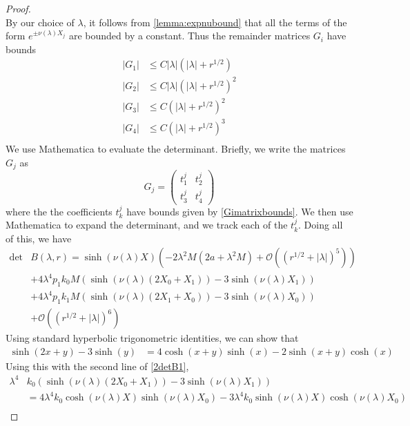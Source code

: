 \documentclass[thesis.tex]{subfiles}
\begin{document}
\begin{lemma}
\begin{proof}
\[\]
By our choice of $\lambda$, it follows from \cref{lemma:expnubound} that all the terms of the form $e^{\pm \nu(\lambda)X_j}$ are bounded by a constant. Thus the remainder matrices $G_i$ have bounds
\begin{equation}\label{Gimatrixbounds}
\begin{aligned}
|G_1| &\leq C |\lambda| (|\lambda| + r^{1/2} )\\
|G_2| &\leq C |\lambda| (|\lambda| + r^{1/2} )^2 \\
|G_3| &\leq C (|\lambda| + r^{1/2} )^2 \\
|G_4| &\leq C (|\lambda| + r^{1/2} )^3 \\
\end{aligned}
\end{equation}
We use Mathematica to evaluate the determinant. Briefly, we write the matrices $G_j$ as
\[
G_j = \begin{pmatrix}t^j_1 & t^j_2 \\ t^j_3 & t^j_4 \end{pmatrix}
\]
where the the coefficients $t^j_k$ have bounds given by \cref{Gimatrixbounds}. We then use Mathematica to expand the determinant, and we track each of the $t^j_k$. Doing all of this, we have
\begin{equation}\label{2detB1}
\begin{aligned}
\det &B(\lambda, r) = \sinh(\nu(\lambda)X)\left(-2 \lambda^2 M (2a + \lambda^2 M) +  \mathcal{O}( (r^{1/2} + |\lambda|)^5 )\right) \\
&+4\lambda^4 p_1 k_0 M \left( \sinh(\nu(\lambda)(2 X_0 + X_1)) - 3 \sinh(\nu(\lambda)X_1)  \right) \\
&+4\lambda^4 p_1 k_1 M \left( \sinh(\nu(\lambda)(2 X_1 + X_0)) - 3 \sinh(\nu(\lambda)X_0)  \right) \\
&+ \mathcal{O}( (r^{1/2} + |\lambda|)^6) 
\end{aligned}
\end{equation}
Using standard hyperbolic trigonometric identities, we can show that 
\begin{align*}
\sinh(2 x + y) - 3 \sinh(y) &= 4 \cosh(x + y)\sinh(x) 
-2 \sinh(x+y)\cosh(x) 
\end{align*}
Using this with the second line of \cref{2detB1}, 
\begin{align*}
\lambda^4 &k_0 \left( \sinh(\nu(\lambda)(2 X_0 + X_1)) - 3 \sinh(\nu(\lambda)X_1)  \right) \\
&= 4 \lambda^4 k_0 \cosh(\nu(\lambda)X)\sinh(\nu(\lambda)X_0) - 3 \lambda^4 k_0 \sinh(\nu(\lambda)X)\cosh(\nu(\lambda)X_0) \\

\end{align*}
\end{proof}
\end{lemma}
\end{document}
